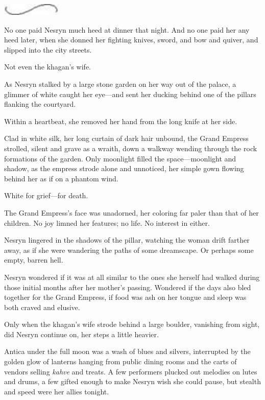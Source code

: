 \includegraphics[width=1.12in,height=0.24in]{images/seperator}

No one paid Nesryn much heed at dinner that night. And no one paid her any heed later, when she donned her fighting knives, sword, and bow and quiver, and slipped into the city streets.

Not even the khagan's wife.

As Nesryn stalked by a large stone garden on her way out of the palace, a glimmer of white caught her eye---and sent her ducking behind one of the pillars flanking the courtyard.

Within a heartbeat, she removed her hand from the long knife at her side.

Clad in white silk, her long curtain of dark hair unbound, the Grand Empress strolled, silent and grave as a wraith, down a walkway wending through the rock formations of the garden. Only moonlight filled the space---moonlight and shadow, as the empress strode alone and unnoticed, her simple gown flowing behind her as if on a phantom wind.

White for grief---for death.

The Grand Empress's face was unadorned, her coloring far paler than that of her children. No joy limned her features; no life. No interest in either.

Nesryn lingered in the shadows of the pillar, watching the woman drift farther away, as if she were wandering the paths of some dreamscape. Or perhaps some empty, barren hell.

Nesryn wondered if it was at all similar to the ones she herself had walked during those initial months after her mother's passing. Wondered if the days also bled together for the Grand Empress, if food was ash on her tongue and sleep was both craved and elusive.

Only when the khagan's wife strode behind a large boulder, vanishing from sight, did Nesryn continue on, her steps a little heavier.

Antica under the full moon was a wash of blues and silvers, interrupted by the golden glow of lanterns hanging from public dining rooms and the carts of vendors selling \emph{kahve} and treats. A few performers plucked out melodies on lutes and drums, a few gifted enough to make Nesryn wish she could pause, but stealth and speed were her allies tonight.

